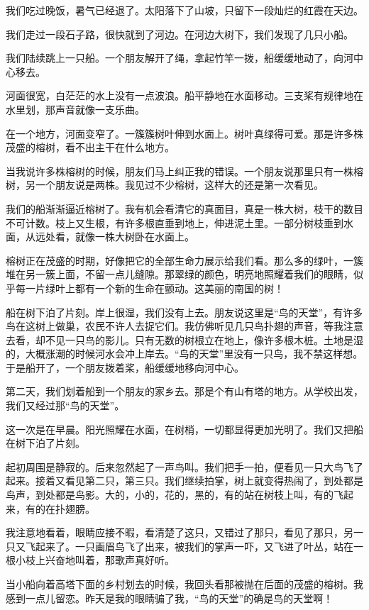 \documentclass[12pt,UTF-8,openany]{ctexbook}
\begin{document}
\begin{Large}
    
    我们吃过晚饭，暑气已经退了。太阳落下了山坡，只留下一段灿烂的红霞在天边。
    
    我们走过一段石子路，很快就到了河边。在河边大树下，我们发现了几只小船。
    
    我们陆续跳上一只船。一个朋友解开了绳，拿起竹竿一拨，船缓缓地动了，向河中心移去。
    
    河面很宽，白茫茫的水上没有一点波浪。船平静地在水面移动。三支桨有规律地在水里划，那声音就像一支乐曲。
    
    在一个地方，河面变窄了。一簇簇树叶伸到水面上。树叶真绿得可爱。那是许多株茂盛的榕树，看不出主干在什么地方。
    
    当我说许多株榕树的时候，朋友们马上纠正我的错误。一个朋友说那里只有一株榕树，另一个朋友说是两株。我见过不少榕树，这样大的还是第一次看见。
    
    我们的船渐渐逼近榕树了。我有机会看清它的真面目，真是一株大树，枝干的数目不可计数。枝上又生根，有许多根直垂到地上，伸进泥土里。一部分树枝垂到水面，从远处看，就像一株大树卧在水面上。
    
    榕树正在茂盛的时期，好像把它的全部生命力展示给我们看。那么多的绿叶，一簇堆在另一簇上面，不留一点儿缝隙。那翠绿的颜色，明亮地照耀着我们的眼睛，似乎每一片绿叶上都有一个新的生命在颤动。这美丽的南国的树！
    
    船在树下泊了片刻。岸上很湿，我们没有上去。朋友说这里是“鸟的天堂”，有许多鸟在这树上做巢，农民不许人去捉它们。我仿佛听见几只鸟扑翅的声音，等我注意去看，却不见一只鸟的影儿。只有无数的树根立在地上，像许多根木桩。土地是湿的，大概涨潮的时候河水会冲上岸去。“鸟的天堂”里没有一只鸟，我不禁这样想。于是船开了，一个朋友拨着桨，船缓缓地移向河中心。
    
    第二天，我们划着船到一个朋友的家乡去。那是个有山有塔的地方。从学校出发，我们又经过那“鸟的天堂”。
    
    这一次是在早晨。阳光照耀在水面，在树梢，一切都显得更加光明了。我们又把船在树下泊了片刻。
    
    起初周围是静寂的。后来忽然起了一声鸟叫。我们把手一拍，便看见一只大鸟飞了起来。接着又看见第二只，第三只。我们继续拍掌，树上就变得热闹了，到处都是鸟声，到处都是鸟影。大的，小的，花的，黑的，有的站在树枝上叫，有的飞起来，有的在扑翅膀。
    
    我注意地看着，眼睛应接不暇，看清楚了这只，又错过了那只，看见了那只，另一只又飞起来了。一只画眉鸟飞了出来，被我们的掌声一吓，又飞进了叶丛，站在一根小枝上兴奋地叫着，那歌声真好听。
    
    当小船向着高塔下面的乡村划去的时候，我回头看那被抛在后面的茂盛的榕树。我感到一点儿留恋。昨天是我的眼睛骗了我，“鸟的天堂”的确是鸟的天堂啊！
    
\end{Large}
\end{document}
